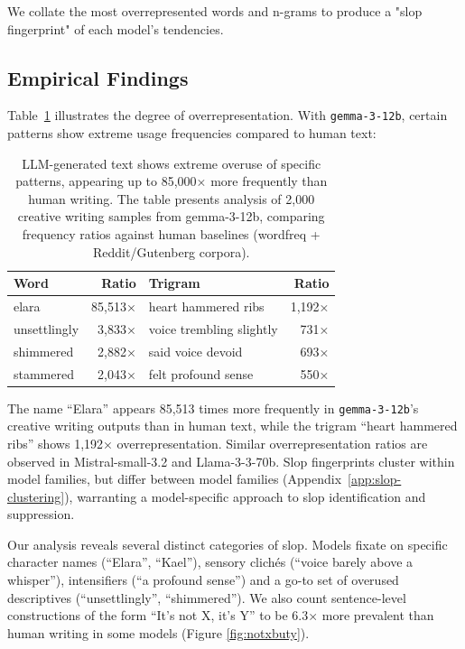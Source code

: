 \documentclass[11pt]{article}
\begin{document}
We collate the most overrepresented words and n-grams to produce a "slop fingerprint" of each model's tendencies.

\subsection{Empirical Findings}

Table~\ref{tab:overrep} illustrates the degree of overrepresentation. With \texttt{gemma-3-12b}, certain patterns show extreme usage frequencies compared to human text:

\begin{table}[h]
\centering
\begin{tabular}{lr|lr}
\toprule
\textbf{Word} & \textbf{Ratio} & \textbf{Trigram} & \textbf{Ratio} \\
\midrule
elara & 85,513× & heart hammered ribs & 1,192× \\
unsettlingly & 3,833× & voice trembling slightly & 731× \\
shimmered & 2,882× & said voice devoid & 693× \\
stammered & 2,043× & felt profound sense & 550× \\
\bottomrule
\end{tabular}
\caption{LLM-generated text shows extreme overuse of specific patterns, appearing up to 85,000× more frequently than human writing. The table presents analysis of 2,000 creative writing samples from gemma-3-12b, comparing frequency ratios against human baselines (wordfreq + Reddit/Gutenberg corpora).}
\label{tab:overrep}
\end{table}

The name ``Elara'' appears 85,513 times more frequently in \texttt{gemma-3-12b}'s creative writing outputs than in human text, while the trigram ``heart hammered ribs'' shows 1,192× overrepresentation. Similar overrepresentation ratios are observed in Mistral-small-3.2 and Llama-3-3-70b. Slop fingerprints cluster within model families, but differ between model families (Appendix~\ref{app:slop-clustering}), warranting a model-specific approach to slop identification and suppression.

Our analysis reveals several distinct categories of slop. Models fixate on specific character names (``Elara'', ``Kael''), sensory clichés (``voice barely above a whisper''), intensifiers (``a profound sense'') and a go-to set of overused descriptives (``unsettlingly'', ``shimmered''). We also count sentence-level constructions of the form ``It's not X, it's Y'' to be 6.3× more prevalent than human writing in some models (Figure \ref{fig:notxbuty}).
\end{document}
